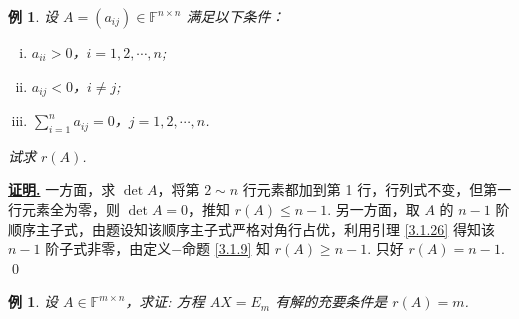 \documentclass[10pt,openany]{article}
\theoremstyle{thmstyle} %
\theoremstyle{defstyle} %
\theoremstyle{prostyle} %
\theoremstyle{exastyle}
\newtheorem{example}[theorem]{例}
\theoremstyle{remstyle}
\renewenvironment{proof}[1][证明]{\par\underline{\textbf{#1.}} \;\fangsong}{\qed\par}
\newcommand{\F}{\mathbb{F}}
\newcommand{\n}{^{n \times n}}
\newcommand{\mn}{^{m \times n}}
\begin{document}
\begin{example}
	设 \( A = (a_{ij}) \in \F\n \) 满足以下条件：
	\begin{enumerate}[(i)]
		\item \( a_{ii} > 0 \)，\( i = 1, 2, \cdots, n \);
		\item \( a_{ij} < 0 \)，\( i \neq j \);
		\item \( \sum_{i=1}^{n} a_{ij} = 0 \)，\( j = 1, 2, \cdots, n \).
	\end{enumerate}
	
	试求 \( r(A) \).
\end{example}

\begin{proof}
	一方面，求 \( \det A \)，将第 \( 2 \sim n \) 行元素都加到第 1 行，行列式不变，但第一行元素全为零，则 \( \det A=0 \)，推知 \( r(A) \leq n-1 \). 另一方面，取 \( A \) 的 \( n-1 \) 阶顺序主子式，由题设知该顺序主子式严格对角行占优，利用引理 \ref{3.1.26} 得知该 \( n-1 \) 阶子式非零，由定义\(-\)命题 \ref{3.1.9} 知 \( r(A) \geq n-1 \). 只好 \( r(A)=n-1 \).
\end{proof}


\begin{example} \label{3.1.28}
	设 \( A \in \F\mn \)，求证: 方程 \( AX = E_m \) 有解的充要条件是 \( r(A) = m \).
\end{example}
\end{document}
